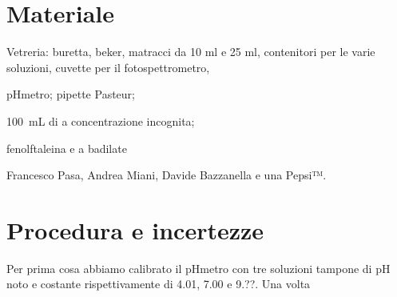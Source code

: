 \section*{Materiale}

\begin{itemize}
        \setlength{\parskip}{-1pt}
        \item{Vetreria: buretta, beker, matracci da 10 ml e 25 ml,
            contenitori per le varie soluzioni, cuvette per il fotospettrometro,
        \item{pHmetro;}
            pipette Pasteur;}
        \item{\SI{100}{\milli\liter} di  a concentrazione incognita;}
        \item{fenolftaleina e  a badilate}
        \item{Francesco Pasa, Andrea Miani, Davide Bazzanella e una Pepsi™.}
\end{itemize}

\section*{Procedura e incertezze}

Per prima cosa abbiamo calibrato il pHmetro con tre soluzioni tampone di pH noto e costante rispettivamente di 4.01, 7.00 e 9.??.
Una volta 

